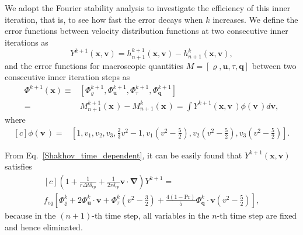 \documentclass[onefignum,onetabnum]{siamart171218}
\begin{document}
We adopt the Fourier stability analysis to investigate the efficiency of this inner iteration, that is, to see how fast the error decays when $k$ increases. We define the error functions between velocity distribution functions at two consecutive inner iterations as
\begin{equation}\label{Diff_Y}
Y^{k+1}(\bm{x},\bm{v})=h_{n+1}^{k+1}(\bm{x},\bm{v})-h_{n+1}^{k}(\bm{x},\bm{v}), %
\end{equation}
and the error functions for macroscopic quantities $M=[\varrho,\bm{u}, \tau,\bm{q}]$ between two consecutive inner iteration steps as 
\begin{equation}\label{Macro_difference}
\begin{aligned}
\Phi^{k+1}(\bm{x})\equiv&
\left[\Phi^{k+1}_\varrho,\Phi^{k+1}_{\bm{u}}, \Phi^{k+1}_\tau,\Phi^{k+1}_{\bm{q}}\right]\\
=&M_{n+1}^{k+1}(\bm{x}\,)-M_{n+1}^{k}(\bm{x}\,)=\int{Y^{k+1}(\bm{x},\bm{v}\,)\phi(\bm{v}\,)}d\bm{v},
\end{aligned}
\end{equation}
where
\begin{equation}
\begin{aligned}[c]
\phi(\bm{v}\,)=&\left[1,v_1,v_2,v_3,\frac{2}{3}v^2-1,v_1\left(v^2-\frac{5}{2}\right),v_2\left(v^2-\frac{5}{2}\right),
v_3\left(v^2-\frac{5}{2}\right)\right].
\end{aligned}
\end{equation} 


From Eq.~\eqref{Shakhov_time_dependent}, it can be easily found that $Y^{k+1}(\bm{x},\bm{v})$ satisfies
\begin{equation}\label{YYY}
\begin{aligned}[c]
\left(1+\frac{1}{r\Delta{t}\delta_{rp}}+\frac{1}{2r\delta_{rp}} \bm{v} \cdot \bm \nabla\right)Y^{k+1}
=\\
	 f_{eq}
	 \left[\Phi^{k}_\varrho+2\Phi^{k}_{\bm{u}}\cdot\bm{v}
	 +\Phi^{k}_\tau\left(v^2-\frac{3}{2}\right)
	 +\frac{4(1-\text{Pr})}{5}\Phi^{k}_{\bm{q}}\cdot{\bm{v}}\left(v^2-\frac{5}{2}\right)\right],
\end{aligned}	 
\end{equation}
because in the $(n+1)$-th time step, all variables in the $n$-th time step are fixed and hence eliminated.

\end{document}
